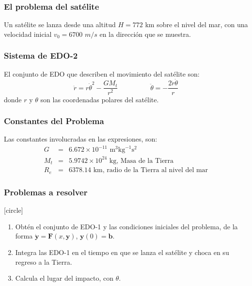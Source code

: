 \maketitle
\fontsize{14}{14}\selectfont
{}
\begin{frame}
\frametitle{El problema del satélite}
\begin{center}
\end{center}
Un satélite se lanza desde una altitud $H=772$ km sobre el nivel del mar, con una velocidad inicial $v_{0}=6700$ $m/s$ en la dirección que se muestra.
\end{frame}
\begin{frame}
\frametitle{Sistema de EDO-2}
El conjunto de EDO que describen el movimiento del satélite son:
\[ \ddot{r} = r  \dot{\theta}^{2} - \dfrac{G M_{t}}{r^{2}}  \hspace{2cm} \ddot{\theta} = - \dfrac{2 \dot{r}\dot{\theta}}{r}\]
donde $r$ y $\theta$ son las coordenadas polares del satélite.
\end{frame}
\begin{frame}
\frametitle{Constantes del Problema}
Las constantes involucradas en las expresiones, son:
\begin{eqnarray*}
G &=& 6.672 \times 10^{-11} \mbox{ m}^{3} \mbox{kg}^{-1} \mbox{s}^{2} \\
M_{t} &=& 5.9742 \times 10^{24} \mbox{ kg, Masa de la Tierra} \\
R_{e} &=& 6378.14 \mbox{ km, radio de la Tierra al nivel del mar} 
\end{eqnarray*}
\end{frame}
\begin{frame}
\frametitle{Problemas a resolver}
[circle]
\begin{enumerate}[<+->]
\item Obtén el conjunto de EDO-1 y las condiciones iniciales del problema, de la forma $\dot{\mathbf{y}} = \mathbf{F}(x,\mathbf{y})$, $\mathbf{y}(0) = \mathbf{b}$.
\item Integra las EDO-1 en el tiempo en que se lanza el satélite y choca en su regreso a la Tierra.
\item Calcula el lugar del impacto, con $\theta$.
\end{enumerate}
\end{frame}

